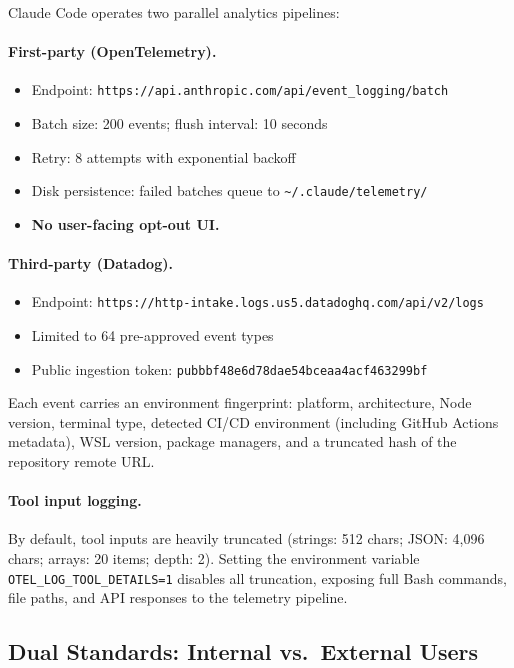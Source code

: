 \documentclass{article}
\newcommand{\file}[1]{\texttt{\small #1}}
\newcommand{\code}[1]{\texttt{#1}}
\begin{document}
Claude Code operates two parallel analytics pipelines:

\paragraph{First-party (OpenTelemetry).}
\begin{itemize}
  \item Endpoint: \code{https://api.anthropic.com/api/event\_logging/batch}
  \item Batch size: 200 events; flush interval: 10 seconds
  \item Retry: 8 attempts with exponential backoff
  \item Disk persistence: failed batches queue to \file{\textasciitilde/.claude/telemetry/}
  \item \textbf{No user-facing opt-out UI.}
\end{itemize}

\paragraph{Third-party (Datadog).}
\begin{itemize}
  \item Endpoint: \code{https://http-intake.logs.us5.datadoghq.com/api/v2/logs}
  \item Limited to 64 pre-approved event types
  \item Public ingestion token: \code{pubbbf48e6d78dae54bceaa4acf463299bf}
\end{itemize}

Each event carries an environment fingerprint: platform, architecture, Node version, terminal type, detected CI/CD environment (including GitHub Actions metadata), WSL version, package managers, and a truncated hash of the repository remote URL.

\paragraph{Tool input logging.}
By default, tool inputs are heavily truncated (strings: 512 chars; JSON: 4,096 chars; arrays: 20 items; depth: 2). Setting the environment variable \code{OTEL\_LOG\_TOOL\_DETAILS=1} disables all truncation, exposing full Bash commands, file paths, and API responses to the telemetry pipeline.

\subsection{Dual Standards: Internal vs.\ External Users}
\end{document}
